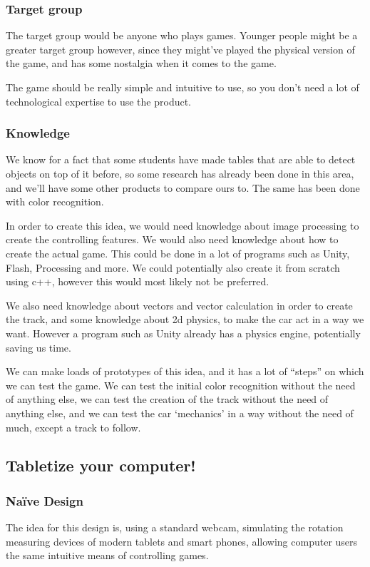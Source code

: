 \subsubsection*{Target group}
The target group would be anyone who plays games. Younger people might be a greater target group however, since they might’ve played the physical version of the game, and has some nostalgia when it comes to the game.
\bigskip

The game should be really simple and intuitive to use, so you don’t need a lot of technological expertise to use the product.

\subsubsection*{Knowledge}
We know for a fact that some students have made tables that are able to detect objects on top of it before, so some research has already been done in this area, and we’ll have some other products to compare ours to. The same has been done with color recognition.
\bigskip

In order to create this idea, we would need knowledge about image processing to create the controlling features. We would also need knowledge about how to create the actual game. This could be done in a lot of programs such as Unity, Flash, Processing and more. We could potentially also create it from scratch using c++, however this would most likely not be preferred.
\bigskip

We also need knowledge about vectors and vector calculation in order to create the track, and some knowledge about 2d physics, to make the car act in a way we want. However a program such as Unity already has a physics engine, potentially saving us time.
\bigskip

We can make loads of prototypes of this idea, and it has a lot of “steps” on which we can test the game. We can test the initial color recognition without the need of anything else, we can test the creation of the track without the need of anything else, and we can test the car ‘mechanics’ in a way without the need of much, except a track to follow.

\pagebreak

\subsection{Tabletize your computer!} \label{nd7}
\subsubsection*{Naïve Design}
The idea for this design is, using a standard webcam, simulating the rotation measuring devices of modern tablets and smart phones, allowing computer users the same intuitive means of controlling games.
\bigskip

